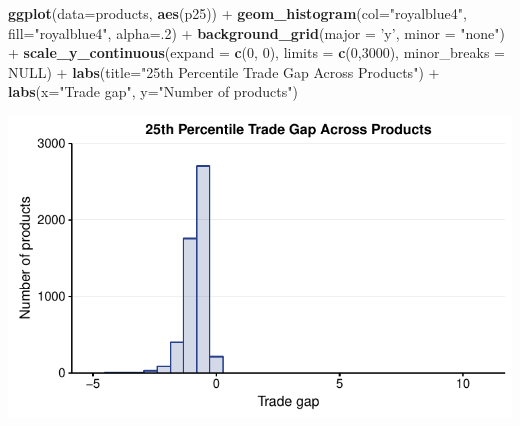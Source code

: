 \documentclass[10pt,]{article}
\newenvironment{Shaded}{\begin{snugshade}}{\end{snugshade}}
\newcommand{\KeywordTok}[1]{\textcolor[rgb]{0.13,0.29,0.53}{\textbf{{#1}}}}
\newcommand{\DataTypeTok}[1]{\textcolor[rgb]{0.13,0.29,0.53}{{#1}}}
\newcommand{\DecValTok}[1]{\textcolor[rgb]{0.00,0.00,0.81}{{#1}}}
\newcommand{\StringTok}[1]{\textcolor[rgb]{0.31,0.60,0.02}{{#1}}}
\newcommand{\OtherTok}[1]{\textcolor[rgb]{0.56,0.35,0.01}{{#1}}}
\newcommand{\NormalTok}[1]{{#1}}
\begin{document}
\begin{Shaded}
\begin{Highlighting}[]
\KeywordTok{ggplot}\NormalTok{(}\DataTypeTok{data=}\NormalTok{products, }\KeywordTok{aes}\NormalTok{(p25)) +}
\StringTok{  }\KeywordTok{geom_histogram}\NormalTok{(}\DataTypeTok{col=}\StringTok{"royalblue4"}\NormalTok{,}
                 \DataTypeTok{fill=}\StringTok{"royalblue4"}\NormalTok{,}
                 \DataTypeTok{alpha=}\NormalTok{.}\DecValTok{2}\NormalTok{) +}
\StringTok{  }\KeywordTok{background_grid}\NormalTok{(}\DataTypeTok{major =} \StringTok{'y'}\NormalTok{, }\DataTypeTok{minor =} \StringTok{"none"}\NormalTok{) +}
\StringTok{  }\KeywordTok{scale_y_continuous}\NormalTok{(}\DataTypeTok{expand =} \KeywordTok{c}\NormalTok{(}\DecValTok{0}\NormalTok{, }\DecValTok{0}\NormalTok{), }\DataTypeTok{limits =} \KeywordTok{c}\NormalTok{(}\DecValTok{0}\NormalTok{,}\DecValTok{3000}\NormalTok{),  }\DataTypeTok{minor_breaks =} \OtherTok{NULL}\NormalTok{) +}
\StringTok{  }\KeywordTok{labs}\NormalTok{(}\DataTypeTok{title=}\StringTok{"25th Percentile Trade Gap Across Products"}\NormalTok{) +}
\StringTok{  }\KeywordTok{labs}\NormalTok{(}\DataTypeTok{x=}\StringTok{"Trade gap"}\NormalTok{, }\DataTypeTok{y=}\StringTok{"Number of products"}\NormalTok{)}
\end{Highlighting}
\end{Shaded}

\begin{center}\includegraphics{Figs/value_summary-4} \end{center}
\end{document}
